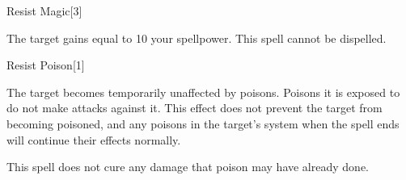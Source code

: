 \begin{spellsection}{Resist Magic}[3]
    \begin{spellheader}
    \end{spellheader}
    \begin{spellcontent}
        \begin{spelltargetinginfo}
        \end{spelltargetinginfo}
        \begin{spelleffects}
            \spelleffect The target gains  equal to 10 \add your spellpower.
            \spelldur \durshort
            \spellspecial This spell cannot be dispelled.
        \end{spelleffects}
    \end{spellcontent}
    \begin{spellfooter}
        \miscastrandom
    \end{spellfooter}
    \begin{spellaugments}
    \end{spellaugments}
\end{spellsection}

\begin{spellsection}{Resist Poison}[1]
    \begin{spellheader}
    \end{spellheader}
    \begin{spellcontent}
        \begin{spelltargetinginfo}
        \end{spelltargetinginfo}
        \begin{spelleffects}
            \spelleffect The target becomes temporarily unaffected by poisons. Poisons it is exposed to do not make attacks against it. This effect does not prevent the target from becoming poisoned, and any poisons in the target's system when the spell ends will continue their effects normally.
            \spelldur \durshort
        \end{spelleffects}
    \end{spellcontent}
    \begin{spellfooter}
        \spellnotes This spell does not cure any damage that poison may have already done.
        \miscastrandom
    \end{spellfooter}
    \begin{spellaugments}
    \end{spellaugments}
\end{spellsection}

